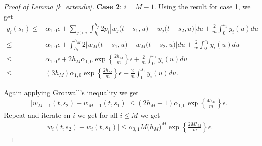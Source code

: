 \documentclass[12pt]{article}
\numberwithin{equation}{section}  %
\begin{document}
\begin{proof}[Proof of Lemma \ref{k_extendw}]
\textbf{Case 2}: $i=M-1$.
Using the result for case 1, we get
\begin{align*} 
y_i(s_1)\leq& \alpha_{1,0}\epsilon
+\sum_{j>i}\int_{ h_i}^{h_j}2p_i
\left|
w_j\big(t-s_1,u\big)-w_j\big(t-s_2,u\big)
\right|
du+\frac{2}{m}\int_{0}^{s_1}y_i(u)du\\
\leq& \alpha_{1,0}\epsilon
+\int_{ h_i}^{h_M}2
\left|
w_M\big(t-s_1,u\big)-w_M\big(t-s_2,u\big)
\right|
du +\frac{2}{m}\int_{0}^{s_1}y_i(u)du\\
\leq& \alpha_{1,0}\epsilon+2h_M\alpha_{1,0} \exp\left\{\frac{2h_M}{m}\right\}\epsilon+\frac{2}{m}\int_{0}^{s_1}y_i(u)du\\
\leq&(3h_M)\alpha_{1,0} \exp\left\{\frac{2h_M}{m}\right\}\epsilon+\frac{2}{m}\int_{0}^{s_1}y_i(u)du.
\end{align*} 

Again applying Gronwall's inequality we get
\begin{align*} 
\left|w_{M-1}(t,s_2)-w_{M-1}(t,s_1)\right|\leq(2h_M+1)\alpha_{1,0} \exp\left\{\frac{4h_M}{m}\right\}\epsilon. 
\end{align*} 
Repeat and iterate on $i$ we get for all $i\leq M$
we get 
\begin{align*} 
\left|w_i(t,s_2)-w_i(t,s_1)\right|\leq \alpha_{0,1}M\big(h_M\big)^M\exp\left\{\frac{2Mh_M}{m}\right\}\epsilon. 
\end{align*} 
\end{proof}
\end{document}
